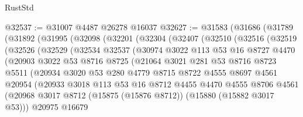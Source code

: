 \begin{lexlean}{RustStd}
\begin{coremodule}
@32537 := @31007 @4487 @26278 @16037
@32627 := @31583
    (@31686
      (@31789
        (@31892
          (@31995
            (@32098
              (@32201
                (@32304
                  (@32407
                    (@32510
                      (@32516
                        (@32519
                          (@32526
                            (@32529
                              (@32534
                                @32537
                                (@30974
                                  @3022
                                  @113
                                  @53
                                  @16
                                  @8727
                                  @4470
                                  (@20903
                                    @3022
                                    @53
                                    @8716
                                    @8725
                                    (@21064
                                      @3021
                                      @281
                                      @53
                                      @8716
                                      @8723
                                      @5511
                                      (@20934
                                        @3020
                                        @53
                                        @280
                                        @4779
                                        @8715
                                        @8722
                                        @4555
                                        @8697
                                        @4561
                                        @20954
                                        (@20933
                                          @3018
                                          @113
                                          @53
                                          @16
                                          @8712
                                          @4455
                                          @4470
                                          @4555
                                          @8706
                                          @4561
                                          (@20968
                                            @3017
                                            @8712
                                            (@15875 (@15876 @8712))
                                            (@15880 (@15882 @3017 @53)))
                                          @20975
                                          @16679

\end{coremodule}
\end{lexlean}
